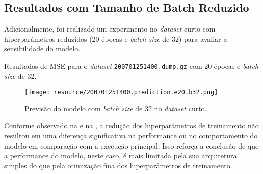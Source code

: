 \subsection{Resultados com Tamanho de Batch Reduzido}
Adicionalmente, foi realizado um experimento no \emph{dataset} curto com hiperparâmetros reduzidos (20 épocas
e \emph{batch size} de 32) para avaliar a sensibilidade do modelo.

\begin{table}[!htb]
    \centering
    \caption{Resultados de MSE para o \emph{dataset} \texttt{200701251400.dump.gz} com 20 épocas e
    \emph{batch size} de 32.}
    \label{tab:modeling-mse-reduced}
    
\end{table}

\begin{figure}[!htb]
    \centering
    \texttt{[image: resource/200701251400.prediction.e20.b32.png]}
    \caption{Previsão do modelo com \emph{batch size} de 32 no \emph{dataset} curto.}
    \label{fig:modeling-prediction-reduced}
\end{figure}

Conforme observado na  e na , a redução
dos hiperparâmetros de treinamento não resultou em uma diferença significativa na performance ou no
comportamento do modelo em comparação com a execução principal. Isso reforça a conclusão de que a performance
do modelo, neste caso, é mais limitada pela sua arquitetura simples do que pela otimização fina dos
hiperparâmetros de treinamento.
